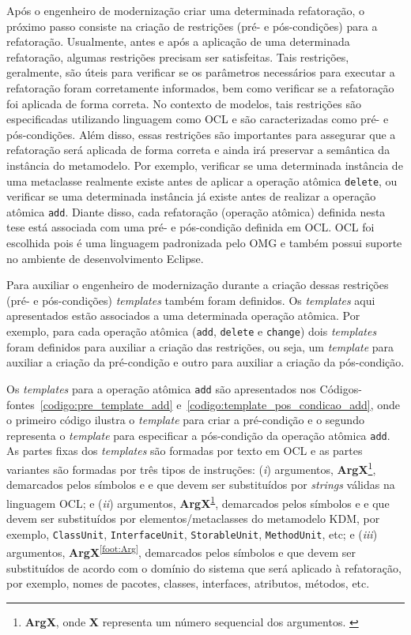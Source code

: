 Após o engenheiro de modernização criar uma determinada refatoração, o próximo passo consiste na criação de restrições (pré- e pós-condições) para a refatoração. Usualmente, antes e após a aplicação de uma determinada refatoração, algumas restrições precisam ser satisfeitas. Tais restrições, geralmente, são úteis para verificar se os parâmetros necessários para executar a refatoração foram corretamente informados, bem como verificar se a refatoração foi aplicada de forma correta. No contexto de modelos, tais restrições são especificadas utilizando linguagem como OCL e são caracterizadas como pré- e pós-condições. Além disso, essas restrições são importantes para assegurar que a refatoração será aplicada de forma correta e ainda irá preservar a semântica da instância do metamodelo. Por exemplo, verificar se uma determinada instância de uma metaclasse realmente existe antes de aplicar a operação atômica \texttt{delete}, ou verificar se uma determinada instância já existe antes de realizar a operação atômica \texttt{add}. Diante disso, cada refatoração (operação atômica) definida nesta tese está associada com uma pré- e pós-condição definida em OCL. OCL foi escolhida pois é uma linguagem padronizada pelo OMG e também possui suporte no ambiente de desenvolvimento Eclipse.

Para auxiliar o engenheiro de modernização durante a criação dessas restrições (pré- e pós-condições) \textit{templates} também foram definidos. Os \textit{templates} aqui apresentados estão associados a uma determinada operação atômica. Por exemplo, para cada operação atômica (\texttt{add}, \texttt{delete} e \texttt{change}) dois \textit{templates} foram definidos para auxiliar a criação das restrições, ou seja, um \textit{template} para auxiliar a criação da pré-condição e outro para auxiliar a criação da pós-condição.

Os \textit{templates} para a operação atômica \texttt{add} são apresentados nos Códigos-fontes~\ref{codigo:pre_template_add} e~\ref{codigo:template_pos_condicao_add}, onde o primeiro código ilustra o \textit{template} para criar a pré-condição e o segundo representa o \textit{template} para especificar a pós-condição da operação atômica \texttt{add}. As partes fixas dos \textit{templates} são formadas por texto em OCL e as partes variantes são formadas por três tipos de instruções: (\textit{i}) argumentos, \textbf{ArgX}\footnote{\textbf{ArgX}, onde \textbf{X} representa um número sequencial dos argumentos. \label{foot:Arg1}}, demarcados pelos símbolos \aspas{\textbf{<\#}} e \aspas{\textbf{\#>}} e que devem ser substituídos por \textit{strings} válidas na linguagem OCL; e (\textit{ii}) argumentos, \textbf{ArgX}\textsuperscript{\ref{foot:Arg1}}, demarcados pelos símbolos \aspas{\textbf{<\%}} e \aspas{\textbf{\%>}} e que devem ser substituídos por elementos/metaclasses do metamodelo KDM, por exemplo, \texttt{ClassUnit}, \texttt{InterfaceUnit}, \texttt{StorableUnit}, \texttt{MethodUnit}, etc; e (\textit{iii}) argumentos, \textbf{ArgX}\textsuperscript{\ref{foot:Arg}}, demarcados pelos símbolos  e  que devem ser substituídos de acordo com o domínio do sistema que será aplicado à refatoração, por exemplo, nomes de pacotes, classes, interfaces, atributos, métodos, etc.  

